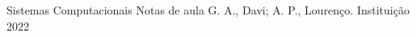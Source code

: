 \documentclass{book}
\begin{document}
\tituloum
{Sistemas Computacionais}
{Notas de aula}
{G. A., Davi; A. P., Lourenço.}
{Instituição}
{2022}

%

\thispagestyle{empty}
\tableofcontents

\newpage

%














\end{document}
